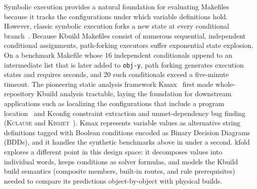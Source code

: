 \documentclass[acmsmall]{acmart}
\newcommand{\tool}{\textsf{kfold}\xspace}
\newcommand{\kmax}{\textsf{Kmax}\xspace}
\begin{document}
Symbolic execution provides a natural foundation for evaluating Makefiles because it tracks the configurations under which variable definitions hold.
However, classic symbolic execution forks a new state at every conditional branch~\cite{king1976symbolic,clarke1976program,cadar2008klee,godefroid2005dart,sen2005cute,nguyen2020using}.
Because Kbuild Makefiles consist of numerous sequential, independent conditional assignments, path-forking executors suffer exponential state explosion.
On a benchmark Makefile whose 16 independent conditionals append to an intermediate list that is later added to \texttt{obj-y}, path forking generates \NBenchIndirectOSStates execution states and requires \NBenchIndirectOSSeconds seconds, and 20 such conditionals exceed a five-minute timeout.
The pioneering static analysis framework \kmax~\cite{gazzillo2017kmax} first made whole-repository Kbuild analysis tractable, laying the foundation for downstream applications such as localizing the configurations that include a program location~\cite{gazzillo2018localizing} and Kconfig constraint extraction and unmet-dependency bug finding (\textsc{Kclause} and \textsc{Kismet}~\cite{oh2021kclause}).
\kmax represents variable values as alternative string definitions tagged with Boolean conditions encoded as Binary Decision Diagrams (BDDs), and it handles the synthetic benchmarks above in under a second.
\tool explores a different point in this design space: it decomposes values into individual words, keeps conditions as solver formulas, and models the Kbuild build semantics (composite members, built-in routes, and rule prerequisites) needed to compare its predictions object-by-object with physical builds.
\end{document}
